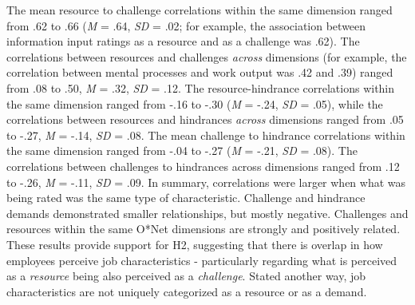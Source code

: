 \documentclass[
  man,mask]{apa7}
\begin{document}
The mean resource to challenge correlations within the same dimension ranged from .62 to .66 (\emph{M} = .64, \emph{SD} = .02; for example, the association between information input ratings as a resource and as a challenge was .62). The correlations between resources and challenges \emph{across} dimensions (for example, the correlation between mental processes and work output was .42 and .39) ranged from .08 to .50, \emph{M} = .32, \emph{SD} = .12. The resource-hindrance correlations within the same dimension ranged from -.16 to -.30 (\emph{M} = -.24, \emph{SD} = .05), while the correlations between resources and hindrances \emph{across} dimensions ranged from .05 to -.27, \emph{M} = -.14, \emph{SD} = .08. The mean challenge to hindrance correlations within the same dimension ranged from -.04 to -.27 (\emph{M} = -.21, \emph{SD} = .08). The correlations between challenges to hindrances across dimensions ranged from .12 to -.26, \emph{M} = -.11, \emph{SD} = .09. In summary, correlations were larger when what was being rated was the same type of characteristic. Challenge and hindrance demands demonstrated smaller relationships, but mostly negative. Challenges and resources within the same O*Net dimensions are strongly and positively related. These results provide support for H2, suggesting that there is overlap in how employees perceive job characteristics - particularly regarding what is perceived as a \emph{resource} being also perceived as a \emph{challenge}. Stated another way, job characteristics are not uniquely categorized as a resource or as a demand.
\end{document}
